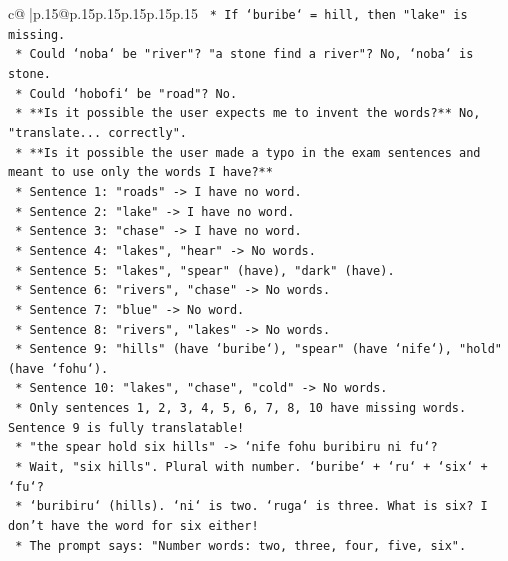 \documentclass{article}
\begin{document}
{\begin{supertabular}{c@{$\;$}|p{.15\linewidth}@{}p{.15\linewidth}p{.15\linewidth}p{.15\linewidth}p{.15\linewidth}p{.15\linewidth}}
{{{\texttt{                *   If `buribe` = hill, then "lake" is missing.} \\
\texttt{            *   Could `noba` be "river"? "a stone find a river"? No, `noba` is stone.} \\
\texttt{            *   Could `hobofi` be "road"? No.} \\
\texttt{            *   **Is it possible the user expects me to invent the words?** No, "translate... correctly".} \\
\texttt{            *   **Is it possible the user made a typo in the exam sentences and meant to use only the words I have?**} \\
\texttt{                *   Sentence 1: "roads" {-}> I have no word.} \\
\texttt{                *   Sentence 2: "lake" {-}> I have no word.} \\
\texttt{                *   Sentence 3: "chase" {-}> I have no word.} \\
\texttt{                *   Sentence 4: "lakes", "hear" {-}> No words.} \\
\texttt{                *   Sentence 5: "lakes", "spear" (have), "dark" (have).} \\
\texttt{                *   Sentence 6: "rivers", "chase" {-}> No words.} \\
\texttt{                *   Sentence 7: "blue" {-}> No word.} \\
\texttt{                *   Sentence 8: "rivers", "lakes" {-}> No words.} \\
\texttt{                *   Sentence 9: "hills" (have `buribe`), "spear" (have `nife`), "hold" (have `fohu`).} \\
\texttt{                *   Sentence 10: "lakes", "chase", "cold" {-}> No words.} \\
\texttt{            *   Only sentences 1, 2, 3, 4, 5, 6, 7, 8, 10 have missing words. Sentence 9 is fully translatable!} \\
\texttt{                *   "the spear hold six hills" {-}> `nife fohu buribiru ni fu`?} \\
\texttt{                *   Wait, "six hills". Plural with number. `buribe` + `ru` + `six` + `fu`?} \\
\texttt{                *   `buribiru` (hills). `ni` is two. `ruga` is three. What is six? I don't have the word for six either!} \\
\texttt{                *   The prompt says: "Number words: two, three, four, five, six".} \\
}}}
\end{supertabular}}
\end{document}
